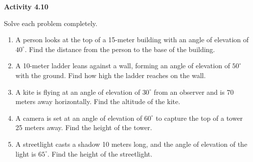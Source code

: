 \vspace{0.3ex}
\noindent\textbf{Activity 4.10}

\vspace{0.2ex}

Solve each problem completely.

\begin{enumerate}
    \item A person looks at the top of a 15-meter building with an angle of elevation of \(40^\circ\). Find the distance from the person to the base of the building.
    \item A 10-meter ladder leans against a wall, forming an angle of elevation of \(50^\circ\) with the ground. Find how high the ladder reaches on the wall.
    \item A kite is flying at an angle of elevation of \(30^\circ\) from an observer and is 70 meters away horizontally. Find the altitude of the kite.
    \item A camera is set at an angle of elevation of \(60^\circ\) to capture the top of a tower 25 meters away. Find the height of the tower.
    \item A streetlight casts a shadow 10 meters long, and the angle of elevation of the light is \(65^\circ\). Find the height of the streetlight.
\end{enumerate}
